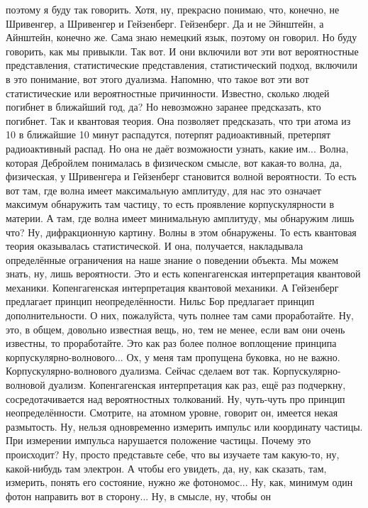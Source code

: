 поэтому я буду так говорить. Хотя, ну, прекрасно понимаю, что, конечно, не
Шривенгер, а Шривенгер и Гейзенберг. Гейзенберг. Да и не Эйнштейн, а Айнштейн,
конечно же. Сама знаю немецкий язык, поэтому он говорил. Но буду говорить, как
мы привыкли. Так вот. И они включили вот эти вот вероятностные представления,
статистические представления, статистический подход, включили в это понимание,
вот этого дуализма. Напомню, что такое вот эти вот статистические или
вероятностные причинности. Известно, сколько людей погибнет в ближайший год, да?
Но невозможно заранее предсказать, кто погибнет. Так и квантовая теория. Она
позволяет предсказать, что три атома из 10 в ближайшие 10 минут распадутся,
потерпят радиоактивный, претерпят радиоактивный распад. Но она не даёт
возможности узнать, какие им... Волна, которая Дебройлем понималась в физическом
смысле, вот какая-то волна, да, физическая, у Шривенгера и Гейзенберг становится
волной вероятности. То есть вот там, где волна имеет максимальную амплитуду, для
нас это означает максимум обнаружить там частицу, то есть проявление
корпускулярности в материи. А там, где волна имеет минимальную амплитуду, мы
обнаружим лишь что? Ну, дифракционную картину. Волны в этом обнаружены. То есть
квантовая теория оказывалась статистической. И она, получается, накладывала
определённые ограничения на наше знание о поведении объекта. Мы можем знать, ну,
лишь вероятности. Это и есть копенгагенская интерпретация квантовой механики.
Копенгагенская интерпретация квантовой механики. А Гейзенберг предлагает принцип
неопределённости. Нильс Бор предлагает принцип дополнительности. О них,
пожалуйста, чуть полнее там сами проработайте. Ну, это, в общем, довольно
известная вещь, но, тем не менее, если вам они очень известны, то проработайте.
Это как раз более полное воплощение принципа корпускулярно-волнового... Ох, у
меня там пропущена буковка, но не важно. Корпускулярно-волнового дуализма.
Сейчас сделаем вот так. Корпускулярно-волновой дуализм. Копенгагенская
интерпретация как раз, ещё раз подчеркну, сосредотачивается над вероятностных
толкований. Ну, чуть-чуть про принцип неопределённости. Смотрите, на атомном
уровне, говорит он, имеется некая размытость. Ну, нельзя одновременно измерить
импульс или координату частицы. При измерении импульса нарушается положение
частицы. Почему это происходит? Ну, просто представьте себе, что вы изучаете там
какую-то, ну, какой-нибудь там электрон. А чтобы его увидеть, да, ну, как
сказать, там, измерить, понять его состояние, нужно же фотономос... Ну, как,
минимум один фотон направить вот в сторону... Ну, в смысле, ну, чтобы он
